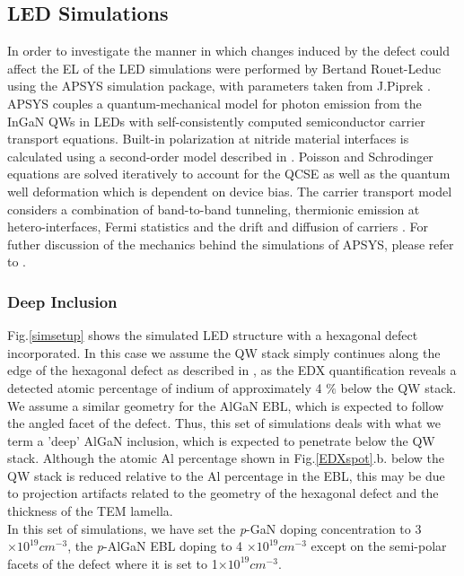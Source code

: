 \subsection{LED Simulations}

In order to investigate the manner in which changes induced by the defect could affect the EL of the LED simulations were performed by Bertand Rouet-Leduc using the APSYS simulation package, with parameters taken from J.Piprek \cite{Piprek2007}. APSYS couples a quantum-mechanical model for photon emission from the InGaN QWs in LEDs with self-consistently computed semiconductor carrier transport equations. Built-in polarization at nitride material interfaces is calculated using a second-order model described in \cite{Pal2011}. Poisson and Schrodinger equations are solved iteratively  to account for the QCSE as well as the quantum well deformation which is dependent on device bias. The carrier transport model considers a combination of band-to-band tunneling, thermionic emission at hetero-interfaces, Fermi statistics and the drift and diffusion of carriers \cite{Piprek2014}. For futher discussion of the mechanics behind the simulations of APSYS, please refer to \cite{Piprek2014}.\\

\subsubsection{Deep Inclusion}
Fig.\ref{simsetup} shows the simulated LED structure with a hexagonal defect incorporated. In this case we assume the QW stack simply continues along the edge of the hexagonal defect as described in \cite{Hangleiter2005}, as the EDX quantification reveals a detected atomic percentage of indium of approximately 4 $\%$ below the QW stack. We assume a similar geometry for the AlGaN EBL, which is expected to follow the angled facet of the defect. Thus, this set of simulations deals with what we term a 'deep' AlGaN inclusion, which is expected to penetrate below the QW stack. Although the atomic Al percentage shown in Fig.\ref{EDXspot}.b. below the QW stack is reduced relative to the Al percentage in the EBL, this may be due to projection artifacts related to the geometry of the hexagonal defect and the thickness of the TEM lamella.\\
In this set of simulations, we have set the {\it p}-GaN doping concentration to 3 $\times 10^{19} cm^{-3}$, the {\it p}-AlGaN EBL doping to 4 $\times 10^{19} cm^{-3}$ except on the semi-polar facets of the defect where it is set to 1$\times 10^{19} cm^{-3}$.


